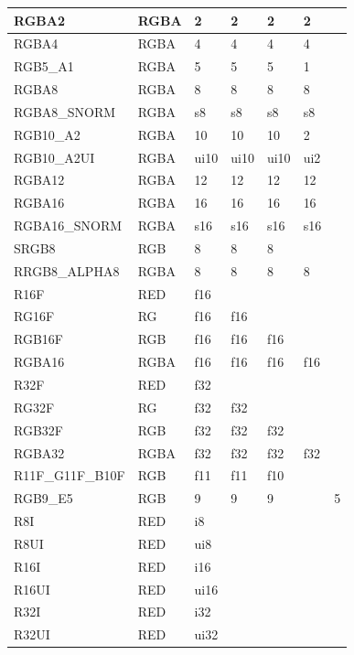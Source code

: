 \begin{longtable}{>{\small}p{}|>{\small}p{}|>{\small}p{}|>{\small}p{}|>{\small}p{}|>{\small}p{}|>{\small}p{}}
  RGBA2         & RGBA & 2 & 2 & 2 & 2 &\\\hline
  RGBA4         & RGBA & 4 & 4 & 4 & 4 &\\\hline
  RGB5\_A1      & RGBA & 5 & 5 & 5 & 1 &\\\hline
  RGBA8         & RGBA & 8 & 8 & 8 & 8 &\\\hline
  RGBA8\_SNORM  & RGBA & s8 & s8 & s8 & s8 &\\\hline
  RGB10\_A2     & RGBA & 10 & 10 & 10 & 2  &\\\hline
  RGB10\_A2UI   & RGBA & ui10 & ui10 & ui10 & ui2 &\\\hline
  RGBA12        & RGBA & 12 & 12 & 12 & 12 &\\\hline
  RGBA16        & RGBA & 16 & 16 & 16 & 16 &\\\hline
  RGBA16\_SNORM & RGBA & s16 & s16 & s16 & s16 &\\\hline
  
  SRGB8         & RGB  & 8 & 8 & 8 & &\\\hline
  RRGB8\_ALPHA8 & RGBA & 8 & 8 & 8 & 8 &\\\hline
  R16F          & RED  & f16 & & & &\\\hline
  RG16F         & RG   & f16 & f16 & & &\\\hline
  RGB16F        & RGB  & f16 & f16 & f16 & &\\\hline
  RGBA16        & RGBA & f16 & f16 & f16 & f16 &\\\hline
  
  R32F          & RED  & f32 & & & &\\\hline
  RG32F         & RG   & f32 & f32 & & &\\\hline
  RGB32F        & RGB  & f32 & f32 & f32 & &\\\hline
  RGBA32        & RGBA & f32 & f32 & f32 & f32 &\\\hline
  
  R11F\_G11F\_B10F  & RGB & f11 & f11 & f10 & &\\\hline
  RGB9\_E5          & RGB & 9   & 9   & 9 & & 5\\\hline
  
  R8I           & RED & i8 & & & &\\\hline
  R8UI          & RED & ui8 & & & &\\\hline
  R16I          & RED & i16 & & & &\\\hline
  R16UI         & RED & ui16 & & & &\\\hline
  R32I          & RED & i32 & & & &\\\hline
  R32UI         & RED & ui32 & & & &\\\hline
  

\end{longtable}
